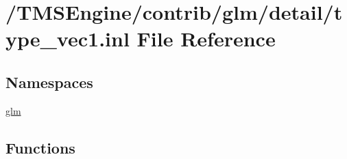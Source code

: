 \hypertarget{type__vec1_8inl}{}\section{/\+T\+M\+S\+Engine/contrib/glm/detail/type\+\_\+vec1.inl File Reference}
\label{type__vec1_8inl}
\subsection*{Namespaces}
\begin{DoxyCompactItemize}
\item 
 \hyperlink{namespaceglm}{glm}
\end{DoxyCompactItemize}
\subsection*{Functions}
